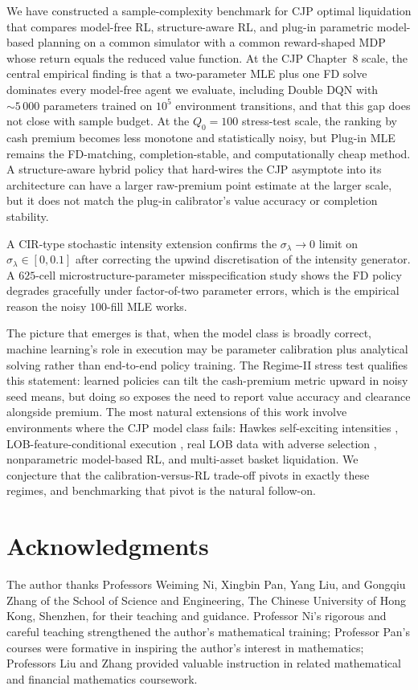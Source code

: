\documentclass[]{interact}
\theoremstyle{plain}
\theoremstyle{definition}
\theoremstyle{remark}
\newcommand{\1}[1]{\mathbf{1}_{\{#1\}}}
\begin{document}
We have constructed a sample-complexity benchmark for CJP optimal liquidation that compares model-free RL, structure-aware RL, and plug-in parametric model-based planning on a common simulator with a common reward-shaped MDP whose return equals the reduced value function. At the CJP Chapter~8 scale, the central empirical finding is that a two-parameter MLE plus one FD solve dominates every model-free agent we evaluate, including Double DQN with $\sim 5\,000$ parameters trained on $10^5$ environment transitions, and that this gap does not close with sample budget. At the $Q_0=100$ stress-test scale, the ranking by cash premium becomes less monotone and statistically noisy, but Plug-in MLE remains the FD-matching, completion-stable, and computationally cheap method. A structure-aware hybrid policy that hard-wires the CJP asymptote into its architecture can have a larger raw-premium point estimate at the larger scale, but it does not match the plug-in calibrator's value accuracy or completion stability.

A CIR-type stochastic intensity extension confirms the $\sigma_\lambda\to0$ limit on $\sigma_\lambda \in [0,0.1]$ after correcting the upwind discretisation of the intensity generator. A $625$-cell microstructure-parameter misspecification study shows the FD policy degrades gracefully under factor-of-two parameter errors, which is the empirical reason the noisy $100$-fill MLE works.

The picture that emerges is that, when the model class is broadly correct, machine learning's role in execution may be parameter calibration plus analytical solving rather than end-to-end policy training. The Regime-II stress test qualifies this statement: learned policies can tilt the cash-premium metric upward in noisy seed means, but doing so exposes the need to report value accuracy and clearance alongside premium. The most natural extensions of this work involve environments where the CJP model class fails: Hawkes self-exciting intensities \citep{alfonsi2016hawkes}, LOB-feature-conditional execution \citep{ninglinjaimungal2021}, real LOB data with adverse selection \citep{karpe2020abides}, nonparametric model-based RL, and multi-asset basket liquidation. We conjecture that the calibration-versus-RL trade-off pivots in exactly these regimes, and benchmarking that pivot is the natural follow-on.

\section*{Acknowledgments}
The author thanks Professors Weiming Ni, Xingbin Pan, Yang Liu, and Gongqiu Zhang of the School of Science and Engineering, The Chinese University of Hong Kong, Shenzhen, for their teaching and guidance. Professor Ni's rigorous and careful teaching strengthened the author's mathematical training; Professor Pan's courses were formative in inspiring the author's interest in mathematics; Professors Liu and Zhang provided valuable instruction in related mathematical and financial mathematics coursework.
\end{document}
